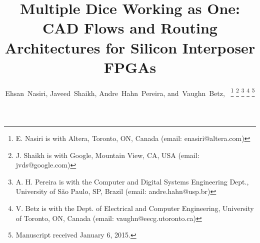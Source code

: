 \documentclass[journal]{IEEEtran}
\begin{document}
%
\title{Multiple Dice Working as One: CAD Flows and Routing Architectures for Silicon Interposer FPGAs}
%
%
%

\author{
		Ehsan~Nasiri,
		Javeed~Shaikh,
		Andre~Hahn~Pereira,
        and~Vaughn~Betz,~%
\thanks{E. Nasiri is with Altera, Toronto, ON, Canada (email: enasiri@altera.com)}%
\thanks{J. Shaikh is with Google, Mountain View, CA, USA (email: jvds@google.com)}%
\thanks{A. H. Pereira is with the Computer and Digital Systems Engineering Dept., University of S\~{a}o Paulo, SP, Brazil (email: andre.hahn@usp.br)}%
\thanks{V. Betz is with the Dept. of Electrical and Computer Engineering, University of Toronto, ON, Canada (email: vaughn@eecg.utoronto.ca)}%
\thanks{Manuscript received January 6, 2015.}}


\maketitle
\end{document}
